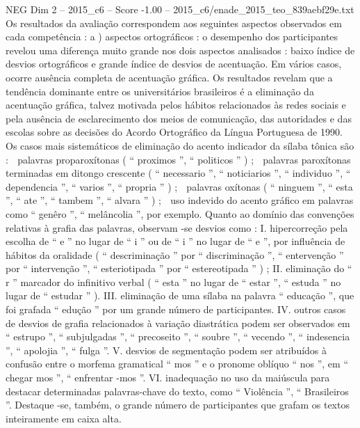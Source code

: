 \begin{textsample}{NEG Dim 2 – 2015\_c6 – Score -1.00 – 2015\_c6/enade\_2015\_teo\_839aebf29e.txt}
Os resultados da avaliação correspondem aos seguintes aspectos observados em cada competência : a ) aspectos ortográficos : o desempenho dos participantes revelou uma diferença muito grande nos dois aspectos analisados : baixo índice de desvios ortográficos e grande índice de desvios de acentuação.
Em vários casos, ocorre ausência completa de acentuação gráfica.
Os resultados revelam que a tendência dominante entre os universitários brasileiros é a eliminação da acentuação gráfica, talvez motivada pelos hábitos relacionados às redes sociais e pela ausência de esclarecimento dos meios de comunicação, das autoridades e das escolas sobre as decisões do Acordo Ortográfico da Língua Portuguesa de 1990.
Os casos mais sistemáticos de eliminação do acento indicador da sílaba tônica são :  palavras proparoxítonas ( “ proximos ”, “ politicos ” ) ;  palavras paroxítonas terminadas em ditongo crescente ( “ necessario ”, “ noticiarios ”, “ individuo ”, “ dependencia ”, “ varios ”, “ propria ” ) ;  palavras oxítonas ( “ ninguem ”, “ esta ”, “ ate ”, “ tambem ”, “ alvara ” ) ;  uso indevido do acento gráfico em palavras como “ genêro ”, “ melâncolia ”, por exemplo.
Quanto ao domínio das convenções relativas à grafia das palavras, observam -se desvios como : I. hipercorreção pela escolha de “ e ” no lugar de “ i ” ou de “ i ” no lugar de “ e ”, por influência de hábitos da oralidade ( “ descriminação ” por “ discriminação ”, “ entervenção ” por “ intervenção ”, “ esteriotipada ” por “ estereotipada ” ) ; II. eliminação do “ r ” marcador do infinitivo verbal ( “ esta ” no lugar de “ estar ”, “ estuda ” no lugar de “ estudar ” ).
III. eliminação de uma sílaba na palavra “ educação ”, que foi grafada “ edução ” por um grande número de participantes.
IV. outros casos de desvios de grafia relacionados à variação diastrática podem ser observados em “ estrupo ”, “ subjulgadas ”, “ precoseito ”, “ soubre ”, “ vecendo ”, “ indesencia ”, “ apolojia ”, “ fulga ”.
V. desvios de segmentação podem ser atribuídos à confusão entre o morfema gramatical “ mos ” e o pronome oblíquo “ nos ”, em “ chegar mos ”, “ enfrentar -mos ”.
VI. inadequação no uso da maiúscula para destacar determinadas palavras-chave do texto, como “ Violência ”, “ Brasileiros ”.
Destaque -se, também, o grande número de participantes que grafam os textos inteiramente em caixa alta.

\end{textsample}
